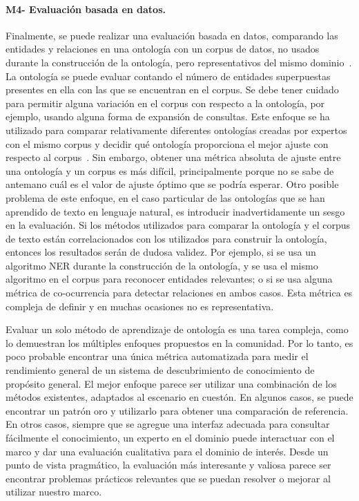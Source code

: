 \paragraph{M4- Evaluación basada en datos.}

Finalmente, se puede realizar una evaluación basada en datos, comparando las entidades y relaciones en una ontología con un corpus de datos, no usados durante la construcción de la ontología, pero representativos del mismo dominio~\cite{brank2005survey}.
La ontología se puede evaluar contando el número de entidades superpuestas presentes en ella con las que se encuentran en el corpus.
Se debe tener cuidado para permitir alguna variación en el corpus con respecto a la ontología, por ejemplo, usando alguna forma de expansión de consultas.
Este enfoque se ha utilizado para comparar relativamente diferentes ontologías creadas por expertos con el mismo corpus y decidir qué ontología proporciona el mejor ajuste con respecto al corpus~\cite{brewster2004data}.
Sin embargo, obtener una métrica absoluta de ajuste entre una ontología y un corpus es más difícil, principalmente porque no se sabe de antemano cuál es el valor de ajuste óptimo que se podría esperar.
Otro posible problema de este enfoque, en el caso particular de las ontologías que se han aprendido de texto en lenguaje natural, es introducir inadvertidamente un sesgo en la evaluación.
Si los métodos utilizados para comparar la ontología y el corpus de texto están correlacionados con los utilizados para construir la ontología, entonces los resultados serán de dudosa validez.
Por ejemplo, si se usa un algoritmo NER durante la construcción de la ontología, y se usa el mismo algoritmo en el corpus para reconocer entidades relevantes; o si se usa alguna métrica de co-ocurrencia para detectar relaciones en ambos casos.
Esta métrica es compleja de definir y en muchas ocasiones no es representativa.

\vspace{1em}

Evaluar un solo método de aprendizaje de ontología es una tarea compleja, como lo demuestran los múltiples enfoques propuestos en la comunidad.
Por lo tanto, es poco probable encontrar una única métrica automatizada para medir el rendimiento general de un sistema de descubrimiento de conocimiento de propósito general.
El mejor enfoque parece ser utilizar una combinación de los métodos existentes, adaptados al escenario en cuestón.
En algunos casos, se puede encontrar un patrón oro y utilizarlo para obtener una comparación de referencia.
En otros casos, siempre que se agregue una interfaz adecuada para consultar fácilmente el conocimiento, un experto en el dominio puede interactuar con el marco y dar una evaluación cualitativa para el dominio de interés.
Desde un punto de vista pragmático, la evaluación más interesante y valiosa parece ser encontrar problemas prácticos relevantes que se puedan resolver o mejorar al utilizar nuestro marco.

